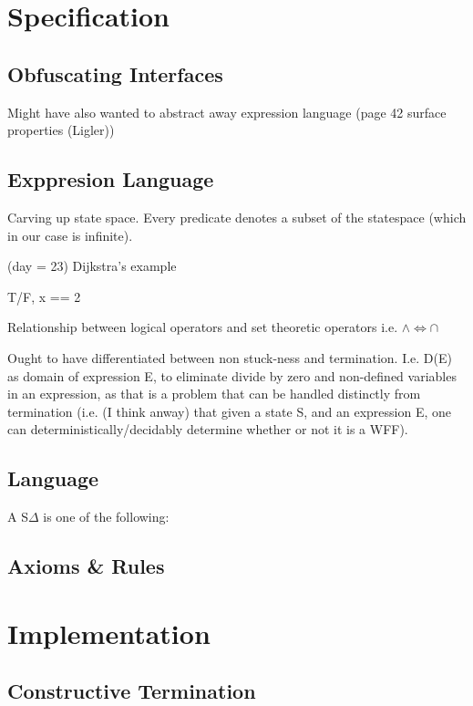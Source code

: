 \documentclass[oneside,12pt]{article}
\begin{document}
\section{Specification}

\subsection{Obfuscating Interfaces}

Might have also wanted to abstract away expression language
(page 42 surface properties (Ligler))

\subsection{Exppresion Language}

Carving up state space.
Every predicate denotes a subset of the statespace
(which in our case is infinite).

(day = 23) Dijkstra's example

T/F, x == 2

Relationship between logical operators and set theoretic operators
i.e. $\wedge \Leftrightarrow \cap$


Ought to have differentiated between non stuck-ness and termination. I.e. D(E) as domain of expression E, to eliminate divide by zero and non-defined variables in an expression, as that is a problem that can be handled distinctly from termination
(i.e. (I think anway) that given a state S, and an expression E, one can deterministically/decidably determine whether or not it is a WFF).


\subsection{Language}

A S$\Delta$ is one of the following:



\subsection{Axioms \& Rules}

\section{Implementation}

\subsection{Constructive Termination}
\end{document}
